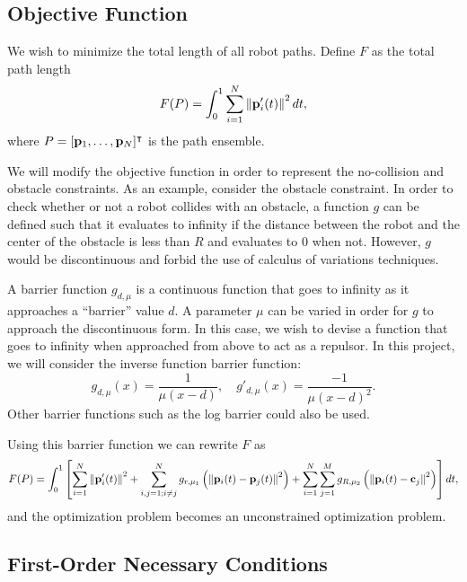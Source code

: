 \documentclass[11pt]{article}
\begin{document}
\subsection{Objective Function}

We wish to minimize the total length of all robot paths. Define \(F\) as the total path length
\begin{equation}
    F(P) = \int_0^1 \sum_{i=1}^{N} \left\lVert \mathbf{p}_i'(t) \right\rVert^2 dt,
\end{equation}
where \(P = [\mathbf{p}_1, \ldots, \mathbf{p}_N]^\intercal\) is the path ensemble.

We will modify the objective function in order to represent the no-collision and obstacle constraints. As an example, consider the obstacle constraint. In order to check whether or not a robot collides with an obstacle, a function \(g\) can be defined such that it evaluates to infinity if the distance between the robot and the center of the obstacle is less than \(R\) and evaluates to 0 when not. However, \(g\) would be discontinuous and forbid the use of calculus of variations techniques.

A barrier function \(g_{d,\mu}\) is a continuous function that goes to infinity as it approaches a ``barrier'' value \(d\). A parameter \(\mu\) can be varied in order for \(g\) to approach the discontinuous form. In this case, we wish to devise a function that goes to infinity when approached from above to act as a repulsor. In this project, we will consider the inverse function barrier function:
    \begin{equation}
        g_{d,\mu}(x) = \frac{1}{\mu(x-d)},
        \quad
        g'_{d,\mu}(x) = \frac{-1}{\mu(x-d)^2}.
    \end{equation}
Other barrier functions such as the log barrier could also be used.

Using this barrier function we can rewrite \(F\) as
\begin{equation}
    F(P) = \int_0^1 \left[ \sum_{i=1}^{N} \left\lVert \mathbf{p}'_i(t) \right\rVert^2 + \sum_{i,j = 1; i \neq j}^{N} g_{r,\mu_1}\left( \left\lVert \mathbf{p}_i(t) - \mathbf{p}_j(t) \right\rVert^2 \right) + \sum_{i=1}^{N} \sum_{j=1}^{M} g_{R,\mu_2}\left( \left\lVert \mathbf{p}_i(t) - \mathbf{c}_j \right\rVert^2 \right) \right] dt,
\end{equation}
and the optimization problem becomes an unconstrained optimization problem.

\subsection{First-Order Necessary Conditions}
\end{document}
